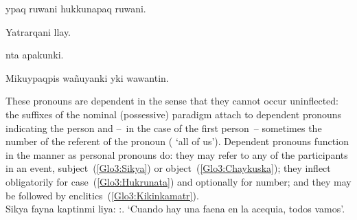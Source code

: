 %
{ypaq ruwani hukkunapaq ruwani.}%
{}%
{}{}%

%
{Yatrarqani llay.}%
{}%
{}{}%

%
{nta apakunki.}%
{}%
{}{}%

%
{Mikuypaqpis wañuyanki yki wawantin.}%
{}%
{}{}%

\noindent
These pronouns are dependent in the sense that they cannot occur uninflected: the suffixes of the nominal (possessive) paradigm attach to dependent pronouns indicating the person and --~in the case of the first person~-- sometimes the number of the referent of the pronoun ( ‘all of us’). Dependent pronouns function in the manner as personal pronouns do: they may refer to any of the participants in an event, subject~(\ref{Glo3:Sikya}) or object~(\ref{Glo3:Chaykuska}); they inflect obligatorily for case~(\ref{Glo3:Hukrunata}) and optionally for number; and they may be followed by enclitics~(\ref{Glo3:Kikinkamatr}).\\

%
{Sikya fayna kaptinmi liya: :.}%
{}%
{‘Cuando hay una faena en la acequia, todos vamos’.}%
{}{}%

